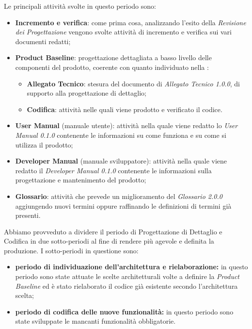 Le principali attività svolte in questo periodo sono:
\begin{itemize}
	\item \textbf{Incremento e verifica}: come prima cosa, analizzando l'esito della \textit{Revisione dei Progettazione} vengono svolte attività di incremento e verifica sui vari documenti redatti;
	\item \textbf{Product Baseline}: progettazione dettagliata a basso livello delle componenti del prodotto, coerente con quanto individuato nella \TB{}:
	\begin{itemize}
		\item \textbf{Allegato Tecnico}: stesura del documento di \textit{Allegato Tecnico 1.0.0}, di supporto alla progettazione di dettaglio;
		\item \textbf{Codifica}: attività nelle quali viene prodotto e verificato il codice.
	\end{itemize}
	\item \textbf{User Manual} (manuale utente): attività nella quale viene redatto lo \textit{User Manual 0.1.0} contenente le informazioni su come funziona e su come si utilizza il prodotto;
	\item \textbf{Developer Manual} (manuale sviluppatore): attività nella quale viene redatto il \textit{Developer Manual 0.1.0} contenente le informazioni sulla progettazione e mantenimento del prodotto;
	\item \textbf{Glossario}: attività che prevede un miglioramento del \textit{Glossario 2.0.0} aggiungendo nuovi termini oppure raffinando le definizioni di termini già presenti.
\end{itemize}

Abbiamo provveduto a dividere il periodo di Progettazione di Dettaglio e Codifica in due sotto-periodi al fine di rendere più agevole e definita la produzione. I sotto-periodi in questione sono:
\begin{itemize}
	\item \textbf{periodo di individuazione dell'architettura e rielaborazione:} in questo periodo sono state attuate le scelte architetturali volte a definire la \textit{Product Baseline} ed è stato rielaborato il codice già esistente secondo l'architettura scelta;
	\item \textbf{periodo di codifica delle nuove funzionalità:} in questo periodo sono state sviluppate le mancanti funzionalità obbligatorie.
\end{itemize}


